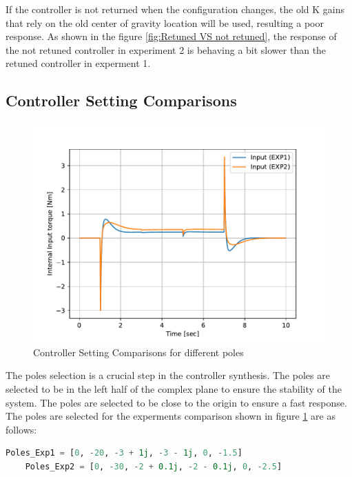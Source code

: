 If the controller is not returned when the configuration changes, the old K gains that rely on the old center of gravity location will be used, resulting a poor response. As shown in the figure \ref{fig:Retuned VS not retuned}, the response of the not retuned controller in experiment 2 is behaving a bit slower than the retuned controller in experment 1.
\subsection{Controller Setting Comparisons}
\begin{figure}[h]
	\centering
	\includegraphics[width=.5\textwidth]{Controller Setting Comparisons}
	\caption{Controller Setting Comparisons for different poles}
	\label{fig:Controller Setting Comparisons for different poles}
\end{figure}


The poles selection is a crucial step in the controller synthesis. The poles are selected to be in the left half of the complex plane to ensure the stability of the system. The poles are selected to be close to the origin to ensure a fast response. The poles are selected for the experments comparison shown in figure \ref{fig:Controller Setting Comparisons for different poles} are as follows:
\begin{lstlisting}[language=Python, caption=The poles for the experments comparison, label={lst:The poles for the experments comparison}]
	Poles_Exp1 = [0, -20, -3 + 1j, -3 - 1j, 0, -1.5]
	Poles_Exp2 = [0, -30, -2 + 0.1j, -2 - 0.1j, 0, -2.5]
\end{lstlisting}

